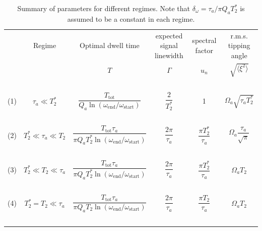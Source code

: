 \begin{table}[ht]
    \centering
    \caption{Summary of parameters for different regimes. Note that $\delta_\omega = \tau_a/\pi Q_a T_2^*$ is assumed to be a constant in each regime. } %
    \begin{tabular}{cccccc}
    	\hline
    	\, & Regime & Optimal dwell time & expected signal linewidth & spectral factor  & r.m.s. tipping angle  \\
        \, &  & $T$ & $\Gamma$ & $u_n$ & $\sqrt{\langle \xi^2\rangle} $ \\
    	\hline
        \, & &   &  &   &   \\
    	(1) & $\tau_a \ll T_2^*$ & $\dfrac{T_{\mathrm{tot}}}{Q_a \ln{ \left( \omega_{\mathrm{end}}/\omega_{\mathrm{start}} \right) }}$ 
        & $\dfrac{2}{T_2^*}$ & 1 & $\Omega_{a}\sqrt{\tau_a T_2^*}$\\
        \, & &   &  &   &   \\
    	(2) & $T_2^* \ll \tau_a \ll T_2$ &  $ \dfrac{T_{\mathrm{tot}}\tau_a}{\pi Q_a T_2^*\ln{ \left( \omega_{\mathrm{end}}/\omega_{\mathrm{start}} \right)}} $ 
        & $\dfrac{2\pi}{\tau_a}$ & $\dfrac{\pi T_2^*}{\tau_a}$ & $\Omega_a\dfrac{\tau_a}{\sqrt{\pi}}$ \\
        \, & &   &  &   &   \\
    	(3) & $T_2^* \ll T_2 \ll \tau_a$ & $ \dfrac{T_{\mathrm{tot}}\tau_a}{\pi Q_a T_2^*\ln{ \left( \omega_{\mathrm{end}}/\omega_{\mathrm{start}} \right)}}  $ 
        & $\dfrac{2\pi}{\tau_a}$ & $\dfrac{\pi T_2^*}{\tau_a}$ & $\Omega_aT_2$\\
        \, & &   &  &   &   \\
    	(4) & $T_2^*=T_2 \ll \tau_a$ & $\dfrac{ T_{\mathrm{tot}} \tau_a }{\pi  Q_a T_2 \ln \left(\omega_{\mathrm{end}}/\omega_{\mathrm{start}}\right)}$ 
        & $\dfrac{2\pi}{\tau_a}$ & $\dfrac{\pi T_2}{\tau_a}$ & $\Omega_a T_2$ \\
        \, & &   &  &   &   \\
        \hline
    \end{tabular}
    \label{tab:summary_of_regimes}
\end{table}







